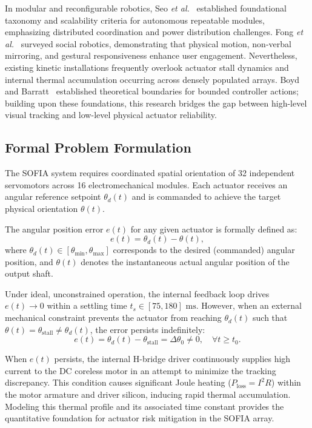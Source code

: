 \documentclass[lettersize,journal]{IEEEtran}
\begin{document}
In modular and reconfigurable robotics, Seo \textit{et al.}~\cite{seo2019modular} established foundational taxonomy and scalability criteria for autonomous repeatable modules, emphasizing distributed coordination and power distribution challenges. Fong \textit{et al.}~\cite{fong2003social} surveyed social robotics, demonstrating that physical motion, non-verbal mirroring, and gestural responsiveness enhance user engagement. Nevertheless, existing kinetic installations frequently overlook actuator stall dynamics and internal thermal accumulation occurring across densely populated arrays. Boyd and Barratt~\cite{boyd1991linear} established theoretical boundaries for bounded controller actions; building upon these foundations, this research bridges the gap between high-level visual tracking and low-level physical actuator reliability.

\subsection{Formal Problem Formulation}
\label{sec:problem_formulation}

The SOFIA system requires coordinated spatial orientation of 32 independent servomotors across 16 electromechanical modules. Each actuator receives an angular reference setpoint $\theta_d(t)$ and is commanded to achieve the target physical orientation $\theta(t)$.

The angular position error $e(t)$ for any given actuator is formally defined as:
\begin{equation}
e(t) = \theta_d(t) - \theta(t),
\label{eq:position_error}
\end{equation}
where $\theta_d(t) \in [\theta_{\min}, \theta_{\max}]$ corresponds to the desired (commanded) angular position, and $\theta(t)$ denotes the instantaneous actual angular position of the output shaft.

Under ideal, unconstrained operation, the internal feedback loop drives $e(t) \to 0$ within a settling time $t_s \in [75, 180]\text{ ms}$. However, when an external mechanical constraint prevents the actuator from reaching $\theta_d(t)$ such that $\theta(t) = \theta_{\text{stall}} \neq \theta_d(t)$, the error persists indefinitely:
\begin{equation}
e(t) = \theta_d(t) - \theta_{\text{stall}} = \Delta\theta_0 \neq 0, \quad \forall t \ge t_0.
\label{eq:persistent_error}
\end{equation}

When $e(t)$ persists, the internal H-bridge driver continuously supplies high current to the DC coreless motor in an attempt to minimize the tracking discrepancy. This condition causes significant Joule heating ($P_{\text{loss}} = I^2 R$) within the motor armature and driver silicon, inducing rapid thermal accumulation. Modeling this thermal profile and its associated time constant provides the quantitative foundation for actuator risk mitigation in the SOFIA array.
\end{document}
